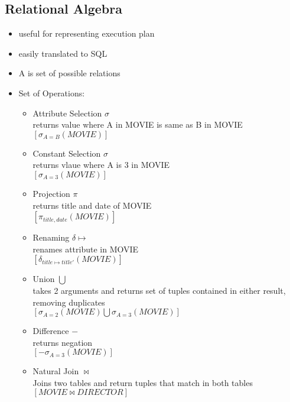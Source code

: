 \documentclass{article}
\newcommand\tab[1][0.5cm]{\hspace*{#1}}
\begin{document}
	\subsection{Relational Algebra}
		\begin{itemize}
			\item useful for representing execution plan
			\item easily translated to SQL
			\item A is set of possible relations
			\item Set of Operations:
				\begin{itemize}
					\item Attribute Selection $\sigma$
					\\ \tab returns value where A in MOVIE is same as B in MOVIE 
					\\ \tab $[\sigma _{A=B}(MOVIE)]$

					\item Constant Selection $\sigma$
					\\ \tab returns vlaue where A is 3 in MOVIE 
					\\ \tab $[\sigma _{A=3}(MOVIE)]$

					\item Projection $\pi$
					\\ \tab returns title and date of MOVIE 
					\\ \tab $[\pi _{title, date}(MOVIE)]$

					\item Renaming $\delta \mapsto$
					\\ \tab renames attribute in MOVIE 
					\\ \tab $[\delta _{title \mapsto title'}(MOVIE)]$

					\item Union $\bigcup$
					\\ \tab takes 2 arguments and returns set of tuples contained in either result, removing duplicates
					\\ \tab $[\sigma _{A=2}(MOVIE) \bigcup \sigma_{A=3}(MOVIE)]$

					\item Difference $-$
					\\ \tab returns negation
					\\ \tab $[-\sigma _{A=3}(MOVIE)]$

					\item Natural Join $\bowtie$
					\\ \tab Joins two tables and return tuples that match in both tables
					\\ \tab $[ MOVIE \bowtie DIRECTOR ]$
				\end{itemize}
		\end{itemize}
\end{document}
